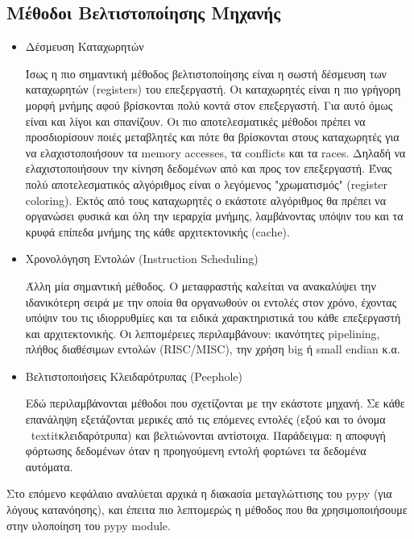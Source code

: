 \subsection{Μέθοδοι Βελτιστοποίησης Μηχανής}

\begin{itemize}

\item Δέσμευση Καταχωρητών

Ίσως η πιο σημαντική μέθοδος βελτιστοποίησης είναι η σωστή δέσμευση των
καταχωρητών (registers) του επεξεργαστή. Οι καταχωρητές είναι η πιο γρήγορη
μορφή μνήμης αφού βρίσκονται πολύ κοντά στον επεξεργαστή. Για αυτό όμως είναι
και λίγοι και σπανίζουν. Οι πιο αποτελεσματικές μέθοδοι πρέπει να προσδιορίσουν
ποιές μεταβλητές και πότε θα βρίσκονται στους καταχωρητές για να
ελαχιστοποιήσουν τα memory accesses, τα conflicts και τα races. Δηλαδή να
ελαχιστοποιήσουν την κίνηση δεδομένων από και προς τον επεξεργαστή. Ένας πολύ
αποτελεσματικός αλγόριθμος είναι ο λεγόμενος "χρωματισμός" (register  coloring).
Εκτός από τους καταχωρητές ο εκάστοτε αλγόριθμος θα πρέπει να  οργανώσει φυσικά
και όλη την ιεραρχία μνήμης, λαμβάνοντας υπόψιν του και τα  κρυφά επίπεδα μνήμης
της κάθε αρχιτεκτονικής (cache).

\item Χρονολόγηση Εντολών (Instruction Scheduling)

Άλλη μία σημαντική μέθοδος. Ο μεταφραστής καλείται να ανακαλύψει την 
ιδανικότερη σειρά με την οποία θα οργανωθούν οι εντολές στον χρόνο, έχοντας 
υπόψιν του τις ιδιορρυθμίες και τα ειδικά χαρακτηριστικά του κάθε επεξεργαστή 
και αρχιτεκτονικής. Οι λεπτομέρειες περιλαμβάνουν: ικανότητες pipelining, 
πλήθος διαθέσιμων εντολών (RISC/MISC), την χρήση big ή small endian κ.α.

\item Βελτιστοποιήσεις Κλειδαρότρυπας (Peephole)

Εδώ περιλαμβάνονται μέθοδοι που σχετίζονται με την εκάστοτε μηχανή. Σε κάθε 
επανάληψη εξετάζονται μερικές από τις επόμενες εντολές (εξού και το όνομα \
textit{κλειδαρότρυπα}) και βελτιώνονται αντίστοιχα. Παράδειγμα: η αποφυγή 
φόρτωσης δεδομένων όταν η προηγούμενη εντολή φορτώνει τα δεδομένα αυτόματα.

\end{itemize}

Στο επόμενο κεφάλαιο αναλύεται αρχικά η διακασία μεταγλώττισης του pypy (για
λόγους κατανόησης), και έπειτα πιο λεπτομερώς η μέθοδος που θα
χρησιμοποιήσουμε στην υλοποίηση του pypy module.

